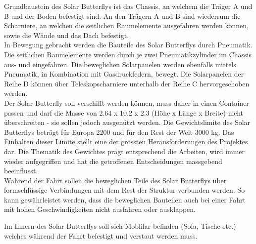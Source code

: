 Grundbaustein des Solar Butterflys ist das Chassis, an welchem die Träger A und B und der Boden befestigt sind. An den Trägern A und B sind wiederrum die Scharniere, an welchen die seitlichen Raumelemente ausgefahren werden können, sowie die Wände und das Dach befestigt.\\
In Bewegung gebracht werden die Bauteile des Solar Butterflys durch Pneumatik. Die seitlichen Raumelemente werden durch je zwei Pneumatikzylinder im Chassis aus- und eingefahren. Die beweglichen Solarpanelen werden ebenfalls mittels Pneumatik, in Kombination mit Gasdruckfedern, bewegt. Die Solarpanelen der Reihe D können über Teleskopscharniere unterhalb der Reihe C hervorgeschoben werden.\\
Der Solar Butterfly soll verschifft werden können, muss daher in einen Container passen und darf die Masse von 2.64 x 10.2 x 2.3 (Höhe x Länge x Breite) nicht überschreiten - sie sollen jedoch ausgenützt werden. Die Gewichtslimite des Solar Butterflys beträgt für Europa 2200 und für den Rest der Welt 3000 kg. Das Einhalten dieser Limite stellt eine der grössten Herausforderungen des Projektes dar. Die Thematik des Gewichtes prägt entsprechend die Arbeiten, wird immer wieder aufgegriffen und hat die getroffenen Entscheidungen massgebend beeinflusst.\\
Während der Fahrt sollen die beweglichen Teile des Solar Butterflys über formschlüssige Verbindungen mit dem Rest der Struktur verbunden werden. So kann gewährleistet werden, dass die beweglichen Bauteilen auch bei einer Fahrt mit hohen Geschwindigkeiten nicht ausfahren oder ausklappen.

Im Innern des Solar Butterflys soll sich Moblilar befinden (Sofa, Tische etc.) welches während der Fahrt befestigt und verstaut werden muss.

\newpage
